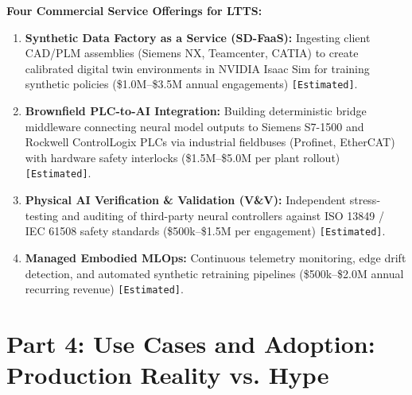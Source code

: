 \documentclass[11pt,a4paper]{article}
\begin{document}
\textbf{Four Commercial Service Offerings for LTTS:}
\begin{enumerate}
    \item \textbf{Synthetic Data Factory as a Service (SD-FaaS):} Ingesting client CAD/PLM assemblies (Siemens NX, Teamcenter, CATIA) to create calibrated digital twin environments in NVIDIA Isaac Sim for training synthetic policies (\$1.0M--\$3.5M annual engagements) \texttt{[Estimated]}.
    \item \textbf{Brownfield PLC-to-AI Integration:} Building deterministic bridge middleware connecting neural model outputs to Siemens S7-1500 and Rockwell ControlLogix PLCs via industrial fieldbuses (Profinet, EtherCAT) with hardware safety interlocks (\$1.5M--\$5.0M per plant rollout) \texttt{[Estimated]}.
    \item \textbf{Physical AI Verification \& Validation (V\&V):} Independent stress-testing and auditing of third-party neural controllers against ISO 13849 / IEC 61508 safety standards (\$500k--\$1.5M per engagement) \texttt{[Estimated]}.
    \item \textbf{Managed Embodied MLOps:} Continuous telemetry monitoring, edge drift detection, and automated synthetic retraining pipelines (\$500k--\$2.0M annual recurring revenue) \texttt{[Estimated]}.
\end{enumerate}

\section{Part 4: Use Cases and Adoption: Production Reality vs. Hype}
\end{document}
